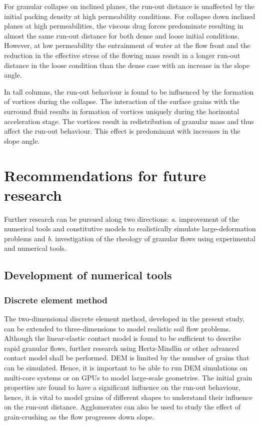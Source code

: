 For granular collapse on inclined planes, the run-out distance is unaffected by 
the initial packing density at high permeability conditions. For collapse down 
inclined planes at high permeabilities, the viscous drag forces predominate 
resulting in almost the same run-out distance for both dense and loose initial 
conditions. However, at low permeability the entrainment of water at the flow 
front and the reduction in the effective stress of the flowing mass result in a 
longer run-out distance in the loose condition than the dense case with an 
increase in the slope angle.

In tall columns, the run-out behaviour is found to be influenced by the 
formation of vortices during the collapse. The interaction of the surface 
grains with the surround fluid results in formation of vortices uniquely during 
the horizontal acceleration stage. The vortices result in redistribution of 
granular mass and thus affect the run-out behaviour. This effect is 
predominant with increases in the slope angle. 

\section{Recommendations for future research}

Further research can be pursued along two directions: \textit{a}. improvement 
of the numerical tools and constitutive models to realistically simulate 
large-deformation problems and \textit{b}. investigation of the rheology of 
granular flows using experimental and numerical tools.

\subsection{Development of numerical tools}

\subsubsection*{Discrete element method}

The two-dimensional discrete element method, developed in the present study, 
can be extended to three-dimensions to model realistic soil flow 
problems. Although the linear-elastic contact model is found to be sufficient 
to 
describe rapid granular flows, further research using Hertz-Mindlin or other 
advanced contact model shall be performed. DEM is limited by the number of 
grains that can be simulated. Hence, it is important to be able to run DEM 
simulations on multi-core systems or on GPUs to model large-scale geometries. 
The initial grain properties are found to have a 
significant influence on the run-out behaviour, hence, it is vital to model 
grains of different shapes to understand their influence on the run-out 
distance. Agglomerates can also be used to study the effect of grain-crushing 
as the flow progresses down slope.

